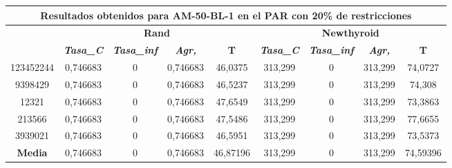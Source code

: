 \documentclass[12pt, spanish]{article}
\begin{document}
\begin{table}[H]
\footnotesize
\begin{tabular}{|c|c|c|c|c|c|c|c|c|}
\hline
\multicolumn{9}{|c|}{\textbf{Resultados obtenidos para AM-50-BL-1 en el PAR con 20\% de restricciones}}                                                                                                           \\ \hline
\multirow{2}{*}{} & \multicolumn{4}{c|}{\textbf{Rand}}                                                            & \multicolumn{4}{c|}{\textbf{Newthyroid}}                                                      \\ \cline{2-9} 
                  & \textit{\textbf{Tasa\_C}} & \textit{\textbf{Tasa\_inf}} & \textit{\textbf{Agr,}} & \textbf{T} & \textit{\textbf{Tasa\_C}} & \textit{\textbf{Tasa\_inf}} & \textit{\textbf{Agr,}} & \textbf{T} \\ \hline
123452244         & 0,746683                  & 0                           & 0,746683               & 46,0375    & 313,299                   & 0                           & 313,299                & 74,0727    \\ \hline
9398429           & 0,746683                  & 0                           & 0,746683               & 46,5237    & 313,299                   & 0                           & 313,299                & 74,308     \\ \hline
12321             & 0,746683                  & 0                           & 0,746683               & 47,6549    & 313,299                   & 0                           & 313,299                & 73,3863    \\ \hline
213566            & 0,746683                  & 0                           & 0,746683               & 47,5486    & 313,299                   & 0                           & 313,299                & 77,6655    \\ \hline
3939021           & 0,746683                  & 0                           & 0,746683               & 46,5951    & 313,299                   & 0                           & 313,299                & 73,5373    \\ \hline
\textbf{Media}    & 0,746683                  & 0                           & 0,746683               & 46,87196   & 313,299                   & 0                           & 313,299                & 74,59396   \\ \hline
\end{tabular}
\end{table}
\end{document}
